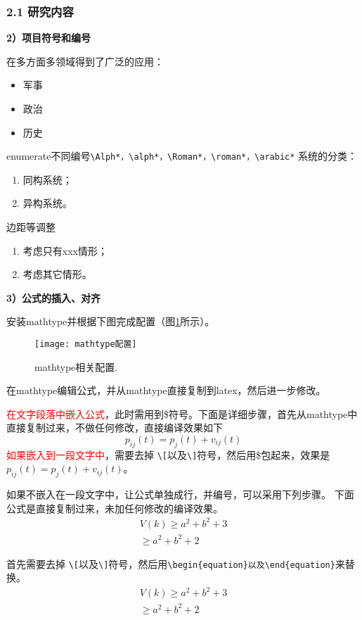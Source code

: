 
\subsubsection{2.1 研究内容}


\noindent\textbf{2）项目符号和编号}

在多方面多领域得到了广泛的应用：
\begin{itemize}
  \item 军事
  \item 政治
  \item 历史
\end{itemize}
enumerate不同编号\verb+\Alph*，\alph*，\Roman*，\roman*，\arabic*+
系统的分类：
\begin{enumerate}[label=\alph*)]   
  \item 同构系统；
  \item 异构系统。
\end{enumerate}
边距等调整
\begin{enumerate}[leftmargin=2em,itemsep=2pt,topsep=0pt,parsep=0pt,label=\alph*)]  
  \item 考虑只有xxx情形；
  \item 考虑其它情形。
\end{enumerate}

\noindent\textbf{3）公式的插入、对齐}

安装mathtype并根据下图完成配置（图\ref{fig_mathtype1}所示）。
 \begin{figure}[!htb]
  \centering
  \texttt{[image: mathtype配置]}
  \caption{mathtype相关配置.}
  \label{fig_mathtype1}
\end{figure}

在mathtype编辑公式，并从mathtype直接复制到latex，然后进一步修改。

\textcolor{red}{在文字段落中嵌入公式}，此时需用到\$符号。下面是详细步骤，首先从mathtype中直接复制过来，不做任何修改，直接编译效果如下
\[{p_{ij}}(t) = {p_j}(t) + {v_{ij}}(t)\]
\textcolor{red}{如果嵌入到一段文字中}，需要去掉 \verb|\[|以及\verb|\]|符号，然后用\$包起来，效果是${p_{ij}}(t) = {p_j}(t) + {v_{ij}}(t)$。

如果不嵌入在一段文字中，让公式单独成行，并编号，可以采用下列步骤。
下面公式是直接复制过来，未加任何修改的编译效果。
\[\begin{array}{l}
V(k) \ge a^2+b^2+3\\
 \ge a^2+b^2+2
\end{array}\]

首先需要去掉 \verb|\[|以及\verb|\]|符号，然后用\verb+\begin{equation}以及\end{equation}+来替换。
\begin{equation}\label{system1}
  \begin{array}{l}
V(k) \ge a^2+b^2+3\\
 \ge a^2+b^2+2
\end{array}
\end{equation}

